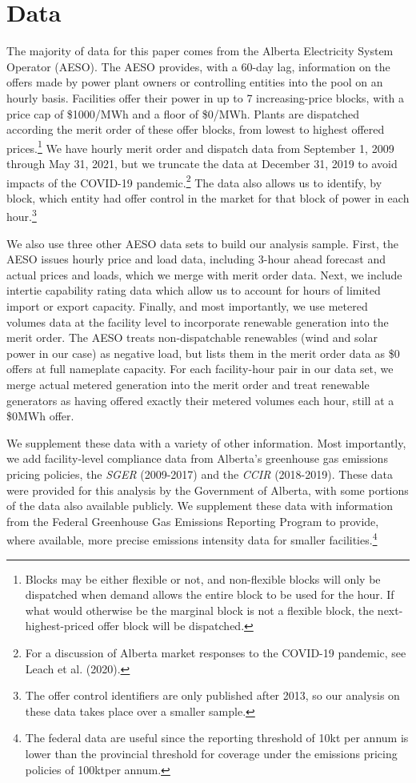 \documentclass[12pt]{article}
\newcommand{\SGER}{\textit{SGER} }
\newcommand{\CCIR}{\textit{CCIR} }
\newcommand{\coe}{\text{CO$_2$e }}
\begin{document}
\section{Data}

The majority of data for this paper comes from the Alberta Electricity System Operator (AESO). The AESO provides, with a 60-day lag, information on the offers made by power plant owners or controlling entities into the pool on an hourly basis. Facilities offer their power in up to 7 increasing-price blocks, with a price cap of \$1000/MWh and a floor of \$0/MWh. Plants are dispatched according the merit order of these offer blocks, from lowest to highest offered prices.\footnote{Blocks may be either flexible or not, and non-flexible blocks will only be dispatched when demand allows the entire block to be used for the hour. If what would otherwise be the marginal block is not a flexible block, the next-highest-priced offer block will be dispatched.} We have hourly merit order and dispatch data from September 1, 2009 through May 31, 2021, but we truncate the data at December 31, 2019 to avoid impacts of the COVID-19 pandemic.\footnote{For a discussion of Alberta market responses to the COVID-19 pandemic, see Leach et al. (2020).} The data also allows us to identify, by block, which entity had offer control in the market for that block of power in each hour.\footnote{The offer control identifiers are only published after 2013, so our analysis on these data takes place over a smaller sample.}

We also use three other AESO data sets to build our analysis sample. First, the AESO issues hourly price and load data, including 3-hour ahead forecast and actual prices and loads, which we merge with merit order data. Next, we include intertie capability rating data which allow us to account for hours of limited import or export capacity. Finally, and most importantly, we use metered volumes data at the facility level to incorporate renewable generation into the merit order. The AESO treats non-dispatchable renewables (wind and solar power in our case) as negative load, but lists them in the merit order data as \$0 offers at full nameplate capacity. For each facility-hour pair in our data set, we merge actual metered generation into the merit order and treat renewable generators as having offered exactly their metered volumes each hour, still at a \$0MWh offer.

We supplement these data with a variety of other information.  Most importantly, we add facility-level compliance data from Alberta's greenhouse gas emissions pricing policies, the \SGER (2009-2017) and the \CCIR (2018-2019). These data were provided for this analysis by the Government of Alberta, with some portions of the data also available publicly. We supplement these data with information from the Federal Greenhouse Gas Emissions Reporting Program to provide, where available, more precise emissions intensity data for smaller facilities.\footnote{The federal data are useful since the reporting threshold of 10kt \coe per annum is lower than the provincial threshold for coverage under the emissions pricing policies of 100kt\coe per annum.}
\end{document}
